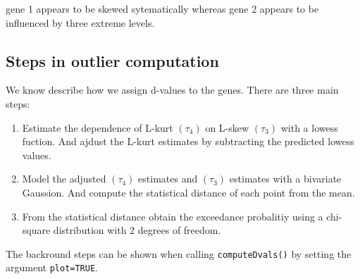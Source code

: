 \documentclass[a4paper, 10pt]{article}\usepackage[]{graphicx}\usepackage[]{color}
\begin{document}
\noindent gene 1 appears to be skewed sytematically
whereas gene 2 appears to be influenced by three 
extreme levels.

\subsection{Steps in outlier computation}
\label{outlier}

\noindent We know describe how we assign d-values to the genes.
There are three main steps:
\begin{enumerate}
\item Estimate the dependence of L-kurt $(\tau_4)$ on L-skew $(\tau_3)$ 
      with a lowess fuction.
      And ajdust the L-kurt estimates by subtracting the predicted lowess values.
\item Model the adjusted $(\tau_4)$ estimates and $(\tau_3)$ estimates 
      with a bivariate Gaussion.
      And compute the statistical distance of each point from the mean.
\item From the statistical distance obtain the exceedance probalitiy using
      a chi-square distribution with 2 degrees of freedom.    
\end{enumerate}

\noindent The backround steps can be shown when calling \texttt{computeDvals()}
by setting the argument \texttt{plot=TRUE}. 
\end{document}
